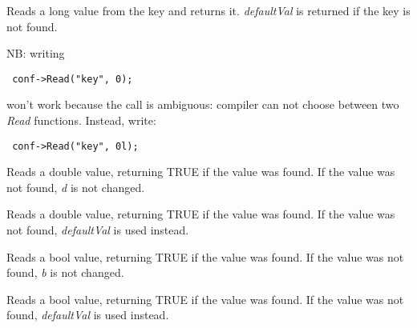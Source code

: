 
Reads a long value from the key and returns it. {\it defaultVal} is returned
if the key is not found.

NB: writing

{\small \begin{verbatim} conf->Read("key", 0); \end{verbatim} }

won't work because the call is ambiguous: compiler can not choose between two
{\it Read} functions. Instead, write:

{\small \begin{verbatim} conf->Read("key", 0l); \end{verbatim} }


Reads a double value, returning TRUE if the value was found. If the value was
not found, {\it d} is not changed.


Reads a double value, returning TRUE if the value was found. If the value was
not found, {\it defaultVal} is used instead.


Reads a bool value, returning TRUE if the value was found. If the value was
not found, {\it b} is not changed.


Reads a bool value, returning TRUE if the value was found. If the value was
not found, {\it defaultVal} is used instead.


\label{wxconfigbaserenameentry}

